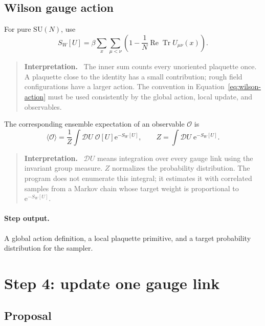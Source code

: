 \documentclass[11pt]{article}
\newcommand{\SUN}[1]{\mathrm{SU}(#1)}
\newcommand{\ReTr}{\operatorname{Re}\operatorname{Tr}}
\newcommand{\ee}{\mathrm{e}}
\newenvironment{interpretation}
  {\begin{quote}\small\noindent\textbf{Interpretation.}\ }
  {\end{quote}}
\begin{document}
\subsection{Wilson gauge action}

For pure \(\SUN{N}\), use
\begin{equation}
  S_W[U]=
  \beta\sum_x\sum_{\mu<\nu}
  \left(
    1-\frac{1}{N}\ReTr U_{\mu\nu}(x)
  \right).
  \label{eq:wilson-action}
\end{equation}

\begin{interpretation}
The inner sum counts every unoriented plaquette once. A plaquette close to the
identity has a small contribution; rough field configurations have a larger
action. The convention in Equation~\eqref{eq:wilson-action} must be used
consistently by the global action, local update, and observables.
\end{interpretation}

The corresponding ensemble expectation of an observable \(\mathcal O\) is
\begin{equation}
  \langle\mathcal O\rangle =
  \frac{1}{Z}\int\mathcal D U\;
  \mathcal O[U]\ee^{-S_W[U]},
  \qquad
  Z=\int\mathcal D U\;\ee^{-S_W[U]}.
  \label{eq:expectation}
\end{equation}

\begin{interpretation}
\(\mathcal D U\) means integration over every gauge link using the invariant
group measure. \(Z\) normalizes the probability distribution. The program does
not enumerate this integral; it estimates it with correlated samples from a
Markov chain whose target weight is proportional to \(\ee^{-S_W[U]}\).
\end{interpretation}

\paragraph{Step output.}
A global action definition, a local plaquette primitive, and a target
probability distribution for the sampler.

\section{Step 4: update one gauge link}

\subsection{Proposal}
\end{document}
